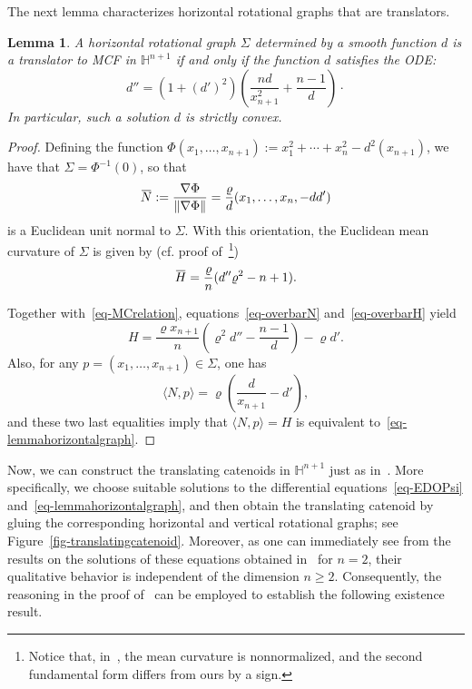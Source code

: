 \documentclass{amsart}[12pt]
\newtheorem{lemma}[theorem]{Lemma}
\theoremstyle{definition}
\theoremstyle{plain}
\newcommand{\h}{\mathbb{H} }
\renewcommand{\rho}{\varrho}
\renewcommand{\Sigma}{\varSigma}
\newcommand{\overbar}[1]{\mkern 1.5mu\overline{\mkern-1.5mu#1\mkern-1.5mu}\mkern 1.5mu}
\begin{document}
The next lemma characterizes horizontal rotational graphs that are translators.

\begin{lemma} \label{lem-rotationalODE021}
A horizontal rotational graph $\Sigma$ determined by a smooth function $d$ is
a translator to {\rm MCF} in $\h^{n+1}$ if and only if the function $d$
satisfies the {\rm ODE}:
\begin{equation} \label{eq-lemmahorizontalgraph}
d''=(1+(d')^2)\left(\frac{nd}{x_{n+1}^2}+\frac{n-1}{d}\right)\cdot
\end{equation}
In particular, such a solution $d$ is strictly convex.
\end{lemma}

\begin{proof}
Defining the function $\Phi(x_1,\dots, x_{n+1}):=x_1^2+\cdots+x_n^2-d^2(x_{n+1})$, we have
that $\Sigma=\Phi^{-1}(0)$, so that
\begin{equation} \label{eq-overbarN}
\overbar N:=\frac{\nabla\Phi}{\|\nabla\Phi\|}=\frac{\rho}{d}(x_1,\dots, x_n,-dd')
\end{equation}
is a Euclidean unit normal to $\Sigma$.
With this orientation, the Euclidean
mean curvature of $\Sigma$ is given by
(cf. proof of~\cite[Corollary 13.37]{andrewsetal}\footnote{Notice that, in~\cite{andrewsetal},
the mean curvature is nonnormalized, and the second fundamental form differs from ours by a sign.})
\begin{equation} \label{eq-overbarH}
\overbar H=\frac{\rho}{n}(d''\rho^2-n+1).
\end{equation}

Together with~\eqref{eq-MCrelation}, equations~\eqref{eq-overbarN}
and~\eqref{eq-overbarH} yield
\[
H=\frac{\rho x_{n+1}}{n}\left( \rho^2d''-\frac{n-1}{d}\right)-\rho d'.
\]
Also, for any $p=(x_1,\dots, x_{n+1})\in\Sigma$, one has
\[
\langle N,p\rangle=\rho\left(\frac{d}{x_{n+1}}-d'\right),
\]
and these two last equalities imply that
$\langle N,p\rangle=H$ is equivalent to~\eqref{eq-lemmahorizontalgraph}.
\end{proof}

Now, we can construct the translating catenoids in $\h^{n+1}$ just as
in~\cite{dLRS}. More specifically, we choose suitable solutions to the differential
equations~\eqref{eq-EDOPsi} and~\eqref{eq-lemmahorizontalgraph},
and then obtain the translating catenoid by gluing the corresponding horizontal
and vertical rotational graphs; see Figure~\ref{fig-translatingcatenoid}.
Moreover, as one can immediately see from the
results on the solutions of these equations obtained in~\cite{dLRS} for $n=2$,
their qualitative behavior is independent of the dimension $n\ge 2$.
Consequently, the reasoning in the proof of~\cite[Theorem 3.10]{dLRS}
can be employed to establish the following existence result.
\end{document}
